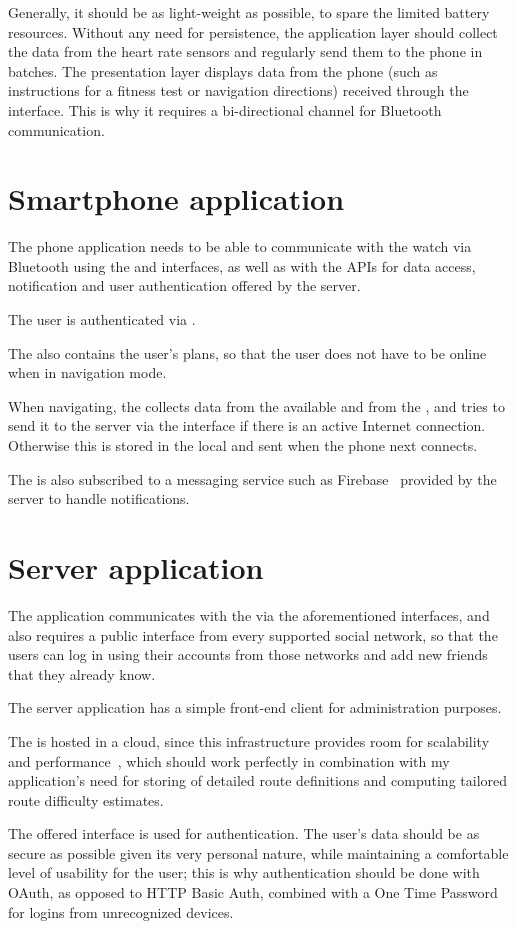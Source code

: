 Generally, it should be as light-weight as possible, to spare the limited battery resources.
Without any need for persistence, the application layer should collect the data from the heart rate sensors and regularly send them to the phone in batches.
The presentation layer displays data from the phone (such as instructions for a fitness test or navigation directions) received through the  interface.
This is why it requires a bi-directional channel for Bluetooth communication.

\section{Smartphone application}
The phone application needs to be able to communicate with the watch via Bluetooth using the  and  interfaces, as well as with the APIs for data access, notification and  user authentication offered by the server.

The user is authenticated via .

The  also contains the user's plans, so that the user does not have to be online when in navigation mode.

When navigating, the  collects data from the available \linebreak{} and from the , and tries to send it to the server via the  interface if there is an active Internet connection.
Otherwise this is stored in the local  and sent when the phone next connects.

The  is also subscribed to a messaging service such as Firebase~\cite{firebase} provided by the server to handle notifications.

\section{Server application}
The  application communicates with the  via the aforementioned interfaces, and also requires a public interface from every supported social network, so that the users can log in using their accounts from those networks and add new friends that they already know.

The server application has a simple front-end client for administration purposes.

The  is hosted in a cloud, since this infrastructure provides room for scalability and performance~\cite{cloud},
which should work perfectly in combination with my application's need for storing of detailed route definitions and computing tailored route difficulty estimates.

The offered  interface is used for authentication.
The user's data should be as secure as possible given its very personal nature, while maintaining a comfortable level of usability for the user;
this is why authentication should be done with OAuth, as opposed to HTTP Basic Auth, combined with a One Time Password for logins from unrecognized devices.
